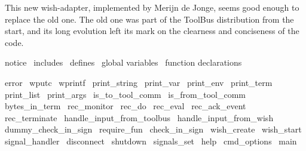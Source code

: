 

This new wish-adapter, implemented by Merijn de Jonge, seems good
enough to replace the old one. The old one was part of the ToolBus
distribution from the start, and its long evolution left its mark
on the clearness and conciseness of the code.

\endmoddef\let\nwnotused=\nwoutput{}\nwstartdeflinemarkup\nwenddeflinemarkup
\LA{}notice~{\nwtagstyle{}}\RA{}
\LA{}includes~{\nwtagstyle{}}\RA{}
\LA{}defines~{\nwtagstyle{}}\RA{}
\LA{}global variables~{\nwtagstyle{}}\RA{}
\LA{}function declarations~{\nwtagstyle{}}\RA{}

\LA{}error~{\nwtagstyle{}}\RA{}
\LA{}wputc~{\nwtagstyle{}}\RA{}
\LA{}wprintf~{\nwtagstyle{}}\RA{}
\LA{}print_string~{\nwtagstyle{}}\RA{}
\LA{}print_var~{\nwtagstyle{}}\RA{}
\LA{}print_env~{\nwtagstyle{}}\RA{}
\LA{}print_term~{\nwtagstyle{}}\RA{}
\LA{}print_list~{\nwtagstyle{}}\RA{}
\LA{}print_args~{\nwtagstyle{}}\RA{}
\LA{}is_to_tool_comm~{\nwtagstyle{}}\RA{}
\LA{}is_from_tool_comm~{\nwtagstyle{}}\RA{}
\LA{}bytes_in_term~{\nwtagstyle{}}\RA{}
\LA{}rec_monitor~{\nwtagstyle{}}\RA{}
\LA{}rec_do~{\nwtagstyle{}}\RA{}
\LA{}rec_eval~{\nwtagstyle{}}\RA{}
\LA{}rec_ack_event~{\nwtagstyle{}}\RA{}
\LA{}rec_terminate~{\nwtagstyle{}}\RA{}
\LA{}handle_input_from_toolbus~{\nwtagstyle{}}\RA{}
\LA{}handle_input_from_wish~{\nwtagstyle{}}\RA{}
\LA{}dummy_check_in_sign~{\nwtagstyle{}}\RA{}
\LA{}require_fun~{\nwtagstyle{}}\RA{}
\LA{}check_in_sign~{\nwtagstyle{}}\RA{}
\LA{}wish_create~{\nwtagstyle{}}\RA{}
\LA{}wish_start~{\nwtagstyle{}}\RA{}
\LA{}signal_handler~{\nwtagstyle{}}\RA{}
\LA{}disconnect~{\nwtagstyle{}}\RA{}
\LA{}shutdown~{\nwtagstyle{}}\RA{}
\LA{}signals_set~{\nwtagstyle{}}\RA{}
\LA{}help~{\nwtagstyle{}}\RA{}
\LA{}cmd_options~{\nwtagstyle{}}\RA{}
\LA{}main~{\nwtagstyle{}}\RA{}

